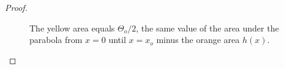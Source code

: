 \begin{proof}
\begin{figure}[h!]\label{app1:fig:parabola-approx-ex}
\center
	\hspace{20pt}%
\caption{The yellow area equals $\Theta_o /2$, the same value of the area under the parabola from $x=0$ until $x=x_o$ minus the orange area $h(x)$.}
\end{figure}


\end{proof}
